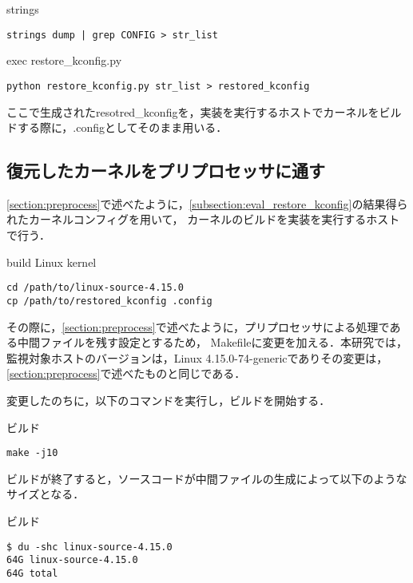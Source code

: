\begin{itembox}[l]{strings}
    \begin{verbatim}
strings dump | grep CONFIG > str_list
    \end{verbatim}
\end{itembox}

\begin{itembox}[l]{exec restore_kconfig.py}
    \begin{verbatim}
python restore_kconfig.py str_list > restored_kconfig
    \end{verbatim}
\end{itembox}

ここで生成されたresotred_kconfigを，実装を実行するホストでカーネルをビルドする際に，.configとしてそのまま用いる．

\subsection{復元したカーネルをプリプロセッサに通す}

\ref{section:preprocess}で述べたように，\ref{subsection:eval_restore_kconfig}の結果得られたカーネルコンフィグを用いて，
カーネルのビルドを実装を実行するホストで行う．

\begin{itembox}[l]{build Linux kernel}
    \begin{verbatim}
cd /path/to/linux-source-4.15.0
cp /path/to/restored_kconfig .config
    \end{verbatim}
\end{itembox}

その際に，\ref{section:preprocess}で述べたように，プリプロセッサによる処理である中間ファイルを残す設定とするため，
Makefileに変更を加える．本研究では，監視対象ホストのバージョンは，Linux 4.15.0-74-genericでありその変更は，\ref{section:preprocess}で述べたものと同じである．

変更したのちに，以下のコマンドを実行し，ビルドを開始する．

\begin{itembox}[l]{ビルド}
    \begin{verbatim}
make -j10
    \end{verbatim}
\end{itembox}

ビルドが終了すると，ソースコードが中間ファイルの生成によって以下のようなサイズとなる．

\begin{itembox}[l]{ビルド}
    \begin{verbatim}
$ du -shc linux-source-4.15.0
64G	linux-source-4.15.0
64G	total
    \end{verbatim}
\end{itembox}

